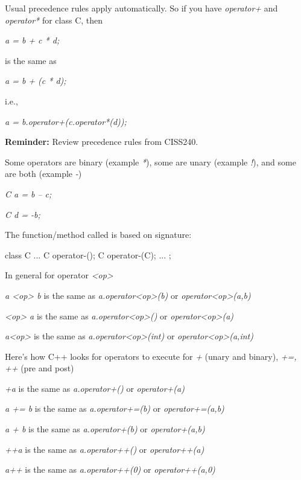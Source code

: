 Usual precedence rules apply automatically. So if you have
\textit{operator+} and \textit{operator*} for class C, then

\textit{a = b + c * d;}

is the same as

\textit{a = b + (c * d);}

i.e.,

\textit{a = b.operator+(c.operator*(d));}

\textbf{Reminder:} Review precedence rules from CISS240.


\newpage{}

Some operators are binary (example \textit{*}), some are unary (example
\textit{!}), and some are both (example \textit{-})

\textit{C a = b -- c;}

\textit{C d = -b;}

The function/method called is based on signature:

\begin{consolethree}[escapeinside=||]
class C
{
    ...
    C operator-();
    C operator-(C);
    ...
};
\end{consolethree}

In general for operator \textit{<op>}

\textit{a <op> b} is the same as \textit{a.operator<op>(b)} or \textit{operator<op>(a,b)}

\textit{<op> a} is the same as \textit{a.operator<op>()} or \textit{operator<op>(a)}

\textit{a<op>} is the same as \textit{a.operator<op>(int)} or \textit{operator<op>(a,int)}

Here's how C++ looks for operators to execute for
\textit{+} (unary and binary), \textit{+=, ++} (pre and post)

\textit{+a} is the same as \textit{a.operator+()} or \textit{operator+(a)}

\textit{a += b} is the same as \textit{a.operator+=(b)} or \textit{operator+=(a,b)}

\textit{a + b} is the same as \textit{a.operator+(b)} or \textit{operator+(a,b)}

\textit{++a} is the same as \textit{a.operator++()} or \textit{operator++(a)}

\textit{a++} is the same as \textit{a.operator++(0)} or \textit{operator++(a,0)}


\newpage{}

